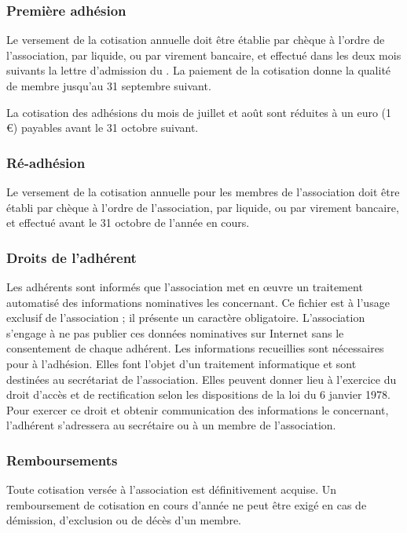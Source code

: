 \subsubsection*{Première adhésion}

Le versement de la cotisation annuelle doit être établie par chèque à l'ordre de l'association, par liquide, ou par virement bancaire, et effectué dans les deux mois suivants la lettre d'admission du \bureau{}. La paiement de la cotisation donne la qualité de membre jusqu'au 31 septembre suivant.

La cotisation des adhésions du mois de juillet et août sont réduites à un euro (1  \euro{}) payables avant le 31 octobre suivant.

\subsubsection*{Ré-adhésion}

Le versement de la cotisation annuelle pour les membres de l'association doit être établi par chèque à l'ordre de l'association, par liquide, ou par virement bancaire, et effectué avant le 31 octobre de l'année en cours.

\subsubsection*{Droits de l'adhérent}
Les adhérents sont informés que l'association met en œuvre un traitement automatisé des informations nominatives les concernant.
Ce fichier est à l'usage exclusif de l'association ; il présente un caractère obligatoire. L'association s'engage à ne pas publier ces données nominatives sur Internet sans le consentement de chaque adhérent.
Les informations recueillies sont nécessaires pour à l'adhésion. Elles font l'objet d'un traitement informatique et sont destinées au secrétariat de l'association. Elles peuvent donner lieu à l'exercice du droit d'accès et de rectification selon les dispositions de la loi du 6 janvier 1978. Pour exercer ce droit et obtenir communication des informations le concernant, l'adhérent s'adressera au secrétaire ou à un membre de l'association.

\subsubsection*{Remboursements}

Toute cotisation versée à l'association est définitivement acquise. Un remboursement de cotisation en cours d'année ne peut être exigé en cas de démission, d'exclusion ou de décès d'un membre.

